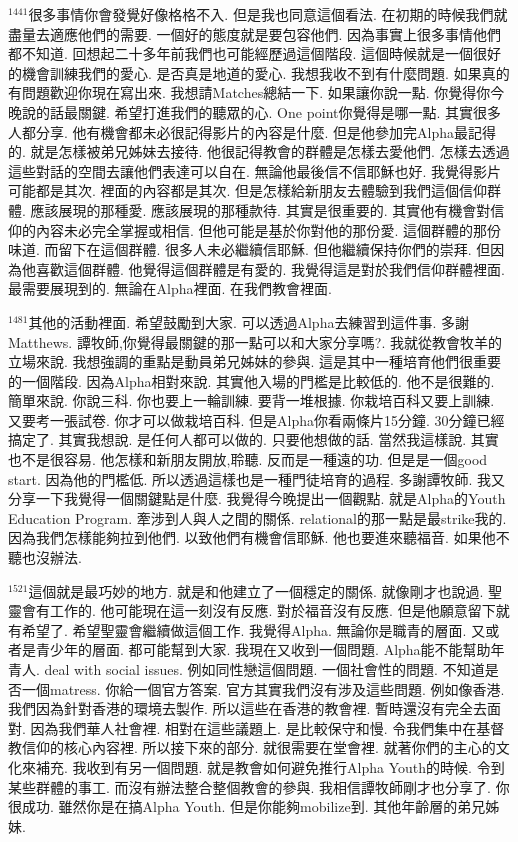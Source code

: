 \documentclass{book}
\begin{document}
$^{1441}$很多事情你會發覺好像格格不入.
但是我也同意這個看法.
在初期的時候我們就盡量去適應他們的需要.
一個好的態度就是要包容他們.
因為事實上很多事情他們都不知道.
回想起二十多年前我們也可能經歷過這個階段.
這個時候就是一個很好的機會訓練我們的愛心.
是否真是地道的愛心.
我想我收不到有什麼問題.
如果真的有問題歡迎你現在寫出來.
我想請Matches總結一下.
如果讓你說一點.
你覺得你今晚說的話最關鍵.
希望打進我們的聽眾的心.
One point你覺得是哪一點.
其實很多人都分享.
他有機會都未必很記得影片的內容是什麼.
但是他參加完Alpha最記得的.
就是怎樣被弟兄姊妹去接待.
他很記得教會的群體是怎樣去愛他們.
怎樣去透過這些對話的空間去讓他們表達可以自在.
無論他最後信不信耶穌也好.
我覺得影片可能都是其次.
裡面的內容都是其次.
但是怎樣給新朋友去體驗到我們這個信仰群體.
應該展現的那種愛.
應該展現的那種款待.
其實是很重要的.
其實他有機會對信仰的內容未必完全掌握或相信.
但他可能是基於你對他的那份愛.
這個群體的那份味道.
而留下在這個群體.
很多人未必繼續信耶穌.
但他繼續保持你們的崇拜.
但因為他喜歡這個群體.
他覺得這個群體是有愛的.
我覺得這是對於我們信仰群體裡面.
最需要展現到的.
無論在Alpha裡面.
在我們教會裡面.

$^{1481}$其他的活動裡面.
希望鼓勵到大家.
可以透過Alpha去練習到這件事.
多謝Matthews.
譚牧師,你覺得最關鍵的那一點可以和大家分享嗎?.
我就從教會牧羊的立場來說.
我想強調的重點是動員弟兄姊妹的參與.
這是其中一種培育他們很重要的一個階段.
因為Alpha相對來說.
其實他入場的門檻是比較低的.
他不是很難的.
簡單來說.
你說三科.
你也要上一輪訓練.
要背一堆根據.
你栽培百科又要上訓練.
又要考一張試卷.
你才可以做栽培百科.
但是Alpha你看兩條片15分鐘.
30分鐘已經搞定了.
其實我想說.
是任何人都可以做的.
只要他想做的話.
當然我這樣說.
其實也不是很容易.
他怎樣和新朋友開放,聆聽.
反而是一種遠的功.
但是是一個good start.
因為他的門檻低.
所以透過這樣也是一種門徒培育的過程.
多謝譚牧師.
我又分享一下我覺得一個關鍵點是什麼.
我覺得今晚提出一個觀點.
就是Alpha的Youth Education Program.
牽涉到人與人之間的關係.
relational的那一點是最strike我的.
因為我們怎樣能夠拉到他們.
以致他們有機會信耶穌.
他也要進來聽福音.
如果他不聽也沒辦法.

$^{1521}$這個就是最巧妙的地方.
就是和他建立了一個穩定的關係.
就像剛才也說過.
聖靈會有工作的.
他可能現在這一刻沒有反應.
對於福音沒有反應.
但是他願意留下就有希望了.
希望聖靈會繼續做這個工作.
我覺得Alpha.
無論你是職青的層面.
又或者是青少年的層面.
都可能幫到大家.
我現在又收到一個問題.
Alpha能不能幫助年青人.
deal with social issues.
例如同性戀這個問題.
一個社會性的問題.
不知道是否一個matress.
你給一個官方答案.
官方其實我們沒有涉及這些問題.
例如像香港.
我們因為針對香港的環境去製作.
所以這些在香港的教會裡.
暫時還沒有完全去面對.
因為我們華人社會裡.
相對在這些議題上.
是比較保守和慢.
令我們集中在基督教信仰的核心內容裡.
所以接下來的部分.
就很需要在堂會裡.
就著你們的主心的文化來補充.
我收到有另一個問題.
就是教會如何避免推行Alpha Youth的時候.
令到某些群體的事工.
而沒有辦法整合整個教會的參與.
我相信譚牧師剛才也分享了.
你很成功.
雖然你是在搞Alpha Youth.
但是你能夠mobilize到.
其他年齡層的弟兄姊妹.
\end{document}
